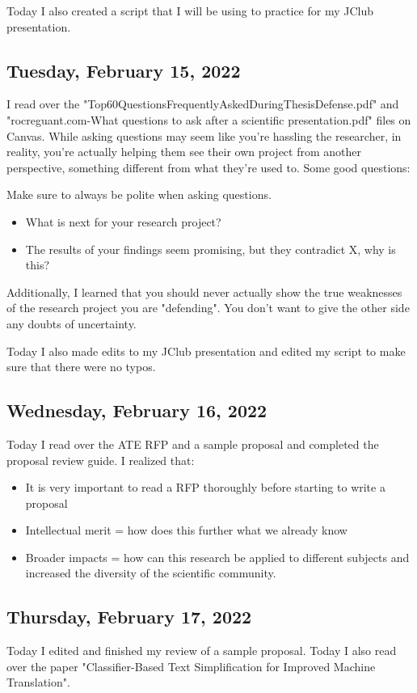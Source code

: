 \documentclass[11pt,letterpaper]{article}
\begin{document}
Today I also created a script that I will be using to practice for my JClub presentation.

\subsection{Tuesday, February 15, 2022}
I read over the "Top60QuestionsFrequentlyAskedDuringThesisDefense.pdf" and "rocreguant.com-What questions to ask after a scientific presentation.pdf" files on Canvas. While asking questions may seem like you're hassling the researcher, in reality, you're actually helping them see their own project from another perspective, something different from what they're used to. Some good questions:

Make sure to always be polite when asking questions.
\begin{itemize}
    \item What is next for your research project?
    \item The results of your findings seem promising, but they contradict X, why is this?
\end{itemize}

Additionally, I learned that you should never actually show the true weaknesses of the research project you are "defending". You don't want to give the other side any doubts of uncertainty. 

Today I also made edits to my JClub presentation and edited my script to make sure that there were no typos.

\subsection{Wednesday, February 16, 2022}
Today I read over the ATE RFP and a sample proposal and completed the proposal review guide. I realized that:
\begin{itemize}
    \item It is very important to read a RFP thoroughly before starting to write a proposal
    \item Intellectual merit = how does this further what we already know 
    \item Broader impacts = how can this research be applied to different subjects and increased the diversity of the scientific community.
\end{itemize}

\subsection{Thursday, February 17, 2022}
Today I edited and finished my review of a sample proposal. Today I also read over the paper 
"Classifier-Based Text Simplification for Improved Machine Translation". 
\end{document}
